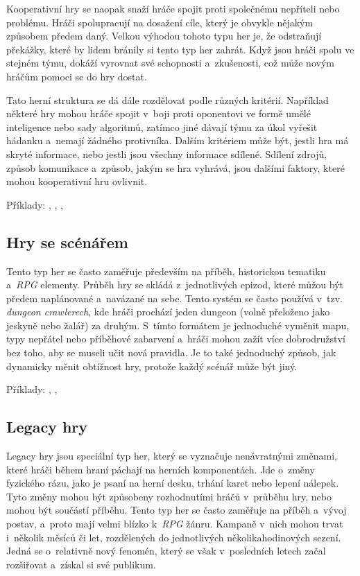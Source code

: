 Kooperativní hry se naopak snaží hráče spojit proti společnému nepříteli nebo problému. Hráči spolupracují na dosažení cíle, který je obvykle nějakým způsobem předem daný. Velkou výhodou tohoto typu her je, že odstraňují překážky, které by lidem bránily si tento typ her zahrát. Když jsou hráči spolu ve stejném týmu, dokáží vyrovnat své schopnosti a~zkušenosti, což může novým hráčům pomoci se do hry dostat.

Tato herní struktura se dá dále rozdělovat podle různých kritérií. Například některé hry mohou hráče spojit v~boji proti oponentovi ve formě umělé inteligence nebo sady algoritmů, zatímco jiné dávají týmu za úkol vyřešit hádanku a~nemají žádného protivníka. Dalším kritériem může být, jestli hra má skryté informace, nebo jestli jsou všechny informace sdílené. Sdílení zdrojů, způsob komunikace a~způsob, jakým se hra vyhrává, jsou dalšími faktory, které mohou kooperativní hru ovlivnit.

Příklady: , , , 


\subsection{Hry se scénářem}
\label{subsec:structure_scenario}

Tento typ her se často zaměřuje především na příběh, historickou tematiku a~\textit{RPG} elementy. Průběh hry se skládá z~jednotlivých epizod, které můžou být předem naplánované a~navázané na sebe. Tento systém se často používá v~tzv. \textit{dungeon crawlerech}, kde hráči prochází jeden dungeon (volně přeloženo jako jeskyně nebo žalář) za druhým. S~tímto formátem je jednoduché vyměnit mapu, typy nepřátel nebo příběhové zabarvení a~hráči mohou zažít více dobrodružství bez toho, aby se museli učit nová pravidla. Je to také jednoduchý způsob, jak dynamicky měnit obtížnost hry, protože každý scénář může být jiný.

Příklady: , , 

\subsection{Legacy hry}
\label{subsec:structure_legacy}

Legacy hry jsou speciální typ her, který se vyznačuje nenávratnými změnami, které hráči během hraní páchají na herních komponentách. Jde o~změny fyzického rázu, jako je psaní na herní desku, trhání karet nebo lepení nálepek. Tyto změny mohou být způsobeny rozhodnutími hráčů v~průběhu hry, nebo mohou být součástí příběhu. Tento typ her se často zaměřuje na příběh a~vývoj postav, a~proto mají velmi blízko k~\textit{RPG} žánru. Kampaně v~nich mohou trvat i~několik měsíců či let, rozdělených do jednotlivých několikahodinových sezení. Jedná se o~relativně nový fenomén, který se však v~posledních letech začal rozšiřovat a~získal si své publikum.

